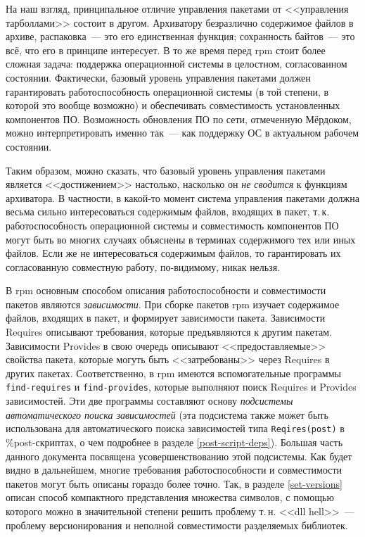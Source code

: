 \documentclass[russian,a4paper,12pt,titlepage]{article}
\begin{document}
На наш взгляд, принципальное отличие управления пакетами от <<управления тарболлами>> состоит в другом.
Архиватору безразлично содержимое файлов в архиве, распаковка~--- это его единственная функция; сохранность
байтов~--- это всё, что его в принципе интересует.  В то же время перед rpm стоит более сложная задача:
поддержка операционной системы в целостном, согласованном состоянии.  Фактически, базовый уровень
управления пакетами должен гарантировать работоспособность операционной системы (в той степени,
в которой это вообще возможно) и обеспечивать совместимость установленных компонентов ПО.  Возможность
обновления ПО по сети, отмеченную Мёрдоком, можно интерпретировать именно так~--- как поддержку ОС
в актуальном рабочем состоянии.

Таким образом, можно сказать, что базовый уровень управления пакетами является <<достижением>> настолько,
насколько он \textit{не сводится} к функциям архиватора.  В частности, в какой-то момент система управления
пакетами должна весьма сильно интересоваться содержимым файлов, входящих в пакет, т.\,к. работоспособность
операционной системы и совместимость компонентов ПО могут быть во многих случаях объяснены в терминах
содержимого тех или иных файлов.  Если же не интересоваться содержимым файлов, то гарантировать их согласованную
совместную работу, по-видимому, никак нельзя.

В rpm основным способом описания работоспособности и совместимости пакетов являются \textit{зависимости}.
При сборке пакетов rpm изучает содержимое файлов, входящих в пакет, и формирует зависимости пакета.
Зависимости Requires описывают требования, которые предъявляются к другим пакетам.  Зависимости Provides
в свою очередь описывают <<предоставляемые>> свойства пакета, которые могуть быть <<затребованы>> через
Requires в других пакетах.  Соответственно, в rpm имеются вспомогательные программы \verb|find-requires|
и \verb|find-provides|, которые выполняют поиск Requires и Provides зависимостей.  Эти две программы
составляют основу \textit{подсистемы автоматического поиска зависимостей} (эта подсистема также может быть
использована для автоматического поиска зависимостей типа \verb|Reqires(post)| в \%post-скриптах,
о чем подробнее в разделе \ref{post-script-deps}).  Большая часть данного документа посвящена
усовершенствованию этой подсистемы.  Как будет видно в дальнейшем, многие требования работоспособности
и совместимости пакетов могут быть описаны гораздо более точно.  Так, в разделе \ref{set-versions} описан
способ компактного представления множества символов, с помощью которого можно в значительной степени
решить проблему т.\,н. <<dll hell>>~--- проблему версионирования и неполной совместимости разделяемых библиотек.
\end{document}
